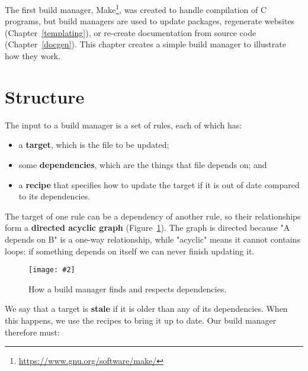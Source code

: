 \documentclass{scrbook}
\newcommand{\chapref}[1]{Chapter~\ref{#1}}
\newcommand{\figref}[1]{Figure~\ref{#1}}
\newcommand{\figpdf}[4]{\begin{figure}%
\centering%
\texttt{[image: \#2]}%
\caption{#3}%
\label{#1}%
\end{figure}}
\newcommand{\glossref}[1]{\textbf{#1}}
\newcommand{\hreffoot}[2]{{#1}\footnote{\href{#2}{#2}}}
\begin{document}
The first build manager,
\hreffoot{Make}{https://www.gnu.org/software/make/},
was created to handle compilation of C programs,
but build managers are used to update packages,
regenerate websites (\chapref{templating}),
or re-create documentation from source code (\chapref{docgen}).
This chapter creates a simple build manager to illustrate how they work.

\section{Structure}\label{builder-structure}


The input to a build manager is a set of rules,
each of which has:

\begin{itemize}

\item 

a \glossref{target},
    which is the file to be updated;



\item 

some \glossref{dependencies},
    which are the things that file depends on;
    and



\item 

a \glossref{recipe}
    that specifies how to update the target
    if it is out of date compared to its dependencies.



\end{itemize}


The target of one rule can be a dependency of another rule,
so their relationships form a \glossref{directed acyclic graph}
(\figref{builder-dependencies}).
The graph is directed because "A depends on B" is a one-way relationship,
while "acyclic" means it cannot contains loops:
if something depends on itself we can never finish updating it.

\figpdf{builder-dependencies}{./builder/dependencies.pdf}{How a build manager finds and respects dependencies.}{0.6}


We say that a target is \glossref{stale}
if it is older than any of its dependencies.
When this happens,
we use the recipes to bring it up to date.
Our build manager therefore must:
\end{document}
